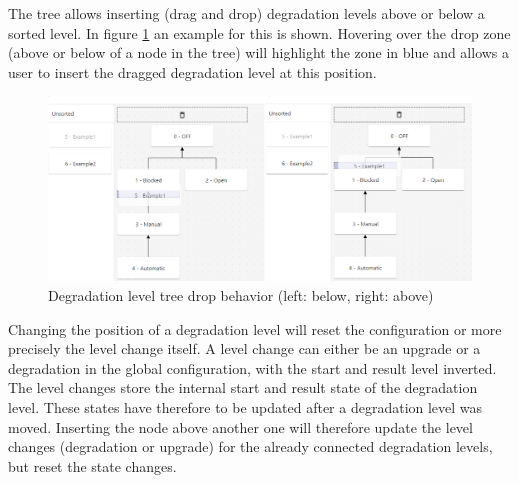 The tree allows inserting (drag and drop) degradation levels above or below a sorted level. In figure \ref{fig:degradation_level_tree_drop} an example for this is shown. Hovering over the drop zone (above or below of a node in the tree) will highlight the zone in blue and allows a user to insert the dragged degradation level at this position. 

\begin{figure}[ht]
    \centering
    \includegraphics[width=\textwidth]{img/degradation_tree_drop.png}
    \caption{Degradation level tree drop behavior (left: below, right: above)}
    \label{fig:degradation_level_tree_drop}
\end{figure}

Changing the position of a degradation level will reset the configuration or more precisely the level change itself. A level change can either be an upgrade or a degradation in the global configuration, with the start and result level inverted. The level changes store the internal start and result state of the degradation level. These states have therefore to be updated after a degradation level was moved. Inserting the node above another one will therefore update the level changes (degradation or upgrade) for the already connected degradation levels, but reset the state changes.

